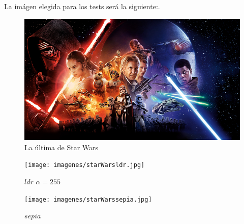 La imágen elegida para los tests será la siguiente:.

\newpage

\begin{figure}
  \begin{center}
	\includegraphics[scale=0.10]{imagenes/starWars.jpg}
	\caption{La última de Star Wars}
	\label{starwars}
  \end{center}
\end{figure}

\begin{figure}
  \begin{center}
	\texttt{[image: imagenes/starWarsldr.jpg]}
	\caption{$ldr$ $\alpha = 255$}
	\label{starwarsldr}
  \end{center}
\end{figure}

\begin{figure}
  \begin{center}
	\texttt{[image: imagenes/starWarssepia.jpg]}
	\caption{$sepia$}
	\label{starwarssepia}
  \end{center}
\end{figure}

